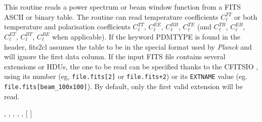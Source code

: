 
\sloppy


 \section[fits2cl*]{ }
\label{sub:fits2cl}
\author{Eric Hivon, Frode K.~Hansen}

\begin{facility}
{This routine reads a power spectrum or beam window function from a FITS ASCII
or binary table. 
The routine can read temperature coefficients $C_\ell^{TT}$ or both temperature and 
polarisation coefficients $C_\ell^{TT}$, $C_\ell^{EE}$, $C_\ell^{BB}$, $C_\ell^{TE}$ (and  
$C_\ell^{TB}$, 
$C_\ell^{EB}$, 
$C_\ell^{ET}$, 
$C_\ell^{BT}$, 
$C_\ell^{BE}$ when applicable). If the 
keyword PDMTYPE is found in the header, fits2cl assumes the table to be in the 
special format used by {\em Planck} and will ignore the first data column. 
If the input FITS file contains several
extensions or HDUs, the one to be read can be specified thanks to the CFITSIO 
, using its number (eg, {\tt file.fits[2]} or {\tt file.fits+2}) or its
{\tt EXTNAME} value (eg. {\tt file.fits[beam\_100x100]}). By default, only the first valid
extension will be read.}
{\modFitstools}
\end{facility}

\begin{f90format}
{%
, %
, %
, %
, %
, [%
]}
\end{f90format}

